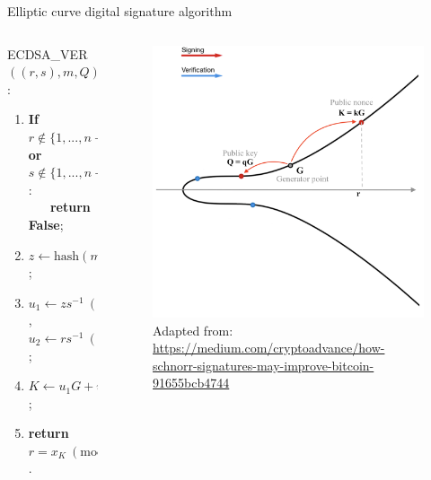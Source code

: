 \documentclass[slidescentered]{beamer}
\newcommand{\source}[1]{\caption*{\tiny Adapted from: {#1}} }
\begin{document}
	\begin{frame}{Elliptic curve digital signature algorithm}
		\begin{columns}
			\begin{column}{0.6\linewidth}
				ECDSA\_VER$((r,s), m, Q)$:
				\begin{enumerate}
					\item<2 -> \textbf{If} $r \notin \{1, ..., n - 1\}$ \textbf{or} $s \notin \{1, ..., n - 1\}$: \\ \textbf{\ \ \ return False};
					\item<3 -> $z \gets \text{hash}(m)$;
					\item<4 -> $u_1 \gets zs^{-1} \ (\text{mod} \ n)$, $u_2 \gets rs^{-1} \ (\text{mod} \ n)$;
					\item<5 -> $K \gets u_1G + u_2Q$;
					\item<6 -> \textbf{return $r = x_K \ (\text{mod} \ n)$}.
				\end{enumerate}
			\end{column}
			\begin{column}{0.5\linewidth}
				\begin{figure}
					 {\vspace*{-0.7cm}
						\hspace*{-1.7cm}
						\includegraphics[scale=0.29]{images/ECDSA4}
						\source{\tiny \url{https://medium.com/cryptoadvance/how-schnorr-signatures-may-improve-bitcoin-91655bcb4744}}}

\end{figure}
\end{column}
\end{columns}
\end{frame}
\end{document}
